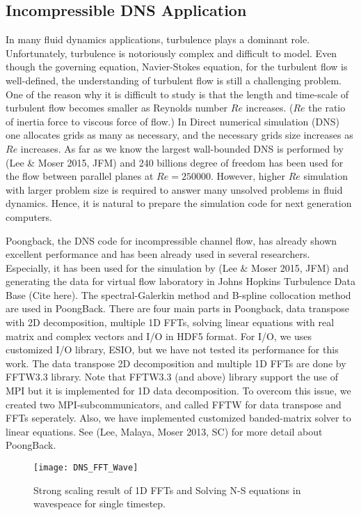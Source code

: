 \subsection{Incompressible DNS Application}
\label{sec:dns_full}

In many fluid dynamics applications, turbulence plays a
dominant role. Unfortunately, turbulence is 
notoriously complex and difficult to model. Even though the governing equation, Navier-Stokes equation, for the turbulent flow is well-defined, the understanding of turbulent flow is still a challenging problem. One of the reason why it is difficult to study is that the length and time-scale of turbulent flow becomes smaller as Reynolds number $Re$ increases. ($Re$ the ratio of inertia force to viscous force of flow.) In Direct numerical simulation (DNS) one allocates grids as many as necessary, and the necessary grids size increases as $Re$ increases. As far as we know the largest wall-bounded DNS is performed by (Lee \& Moser 2015, JFM) and 240 billions degree of freedom has been used for the flow between parallel planes at $Re = 250000$. However, higher $Re$ simulation with larger problem size is required to answer many unsolved problems in fluid dynamics. Hence, it is natural to prepare the simulation code for next generation computers.

Poongback, the DNS code for incompressible channel flow, has already shown excellent performance and has been already used in several researchers. Especially, it has been used for the simulation by (Lee \& Moser 2015, JFM) and generating the data for virtual flow laboratory in Johns Hopkins Turbulence Data Base (Cite here). The spectral-Galerkin method and B-spline collocation method are used in PoongBack. There are four main parts in Poongback, data transpose with 2D decomposition, multiple 1D FFTs, solving linear equations with real matrix and complex vectors and I/O in HDF5 format. For I/O, we uses customized I/O library, ESIO, but we have not tested its performance for this work. The data transpose 2D decomposition and multiple 1D FFTs are done by FFTW3.3 library. Note that FFTW3.3 (and above) library support the use of MPI but it is implemented for 1D data decomposition. To overcom this issue, we created two MPI-subcommunicators, and called FFTW for data transpose and FFTs seperately. Also, we have implemented customized banded-matrix solver to linear equations. See (Lee, Malaya, Moser 2013, SC) for more detail about PoongBack.

\begin{figure}[htb]
 \begin{center}
   \texttt{[image: DNS\_FFT\_Wave]}
   \caption{Strong scaling result of 1D FFTs and Solving N-S equations in wavespeace for single timestep.}
   \label{fig:DNS_strong_scale_fft_wave}
 \end{center}
\end{figure}


